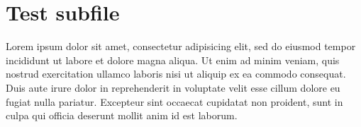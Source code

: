 \documentclass[]{memoir}
\begin{document}
\chapter{Test subfile}

Lorem ipsum dolor sit amet, consectetur adipisicing elit, sed do eiusmod
tempor incididunt ut labore et dolore magna aliqua. Ut enim ad minim veniam,
quis nostrud exercitation ullamco laboris nisi ut aliquip ex ea commodo
consequat. Duis aute irure dolor in reprehenderit in voluptate velit esse
cillum dolore eu fugiat nulla pariatur. Excepteur sint occaecat cupidatat non
proident, sunt in culpa qui officia deserunt mollit anim id est laborum.

\end{document}
